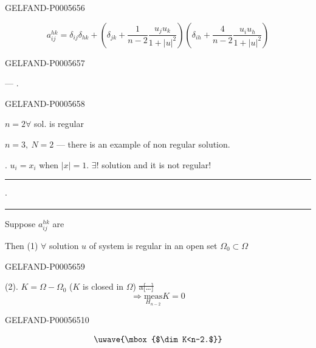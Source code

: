 \begin{GelfandAdjacentEvidence}{GELFAND-P000565}{6}

\[
a_{ij}^{hk}=\delta_{ij}\delta_{hk}+
\left(\delta_{jk}+\frac1{n-2}\frac{u_j u_k}{1+|u|^2}\right)
\left(\delta_{ih}+\frac4{n-2}\frac{u_i u_h}{1+|u|^2}\right)
\]
\end{GelfandAdjacentEvidence}
\begin{GelfandAdjacentEvidence}{GELFAND-P000565}{7}

 — .
\qquad{}
\end{GelfandAdjacentEvidence}
\begin{GelfandAdjacentEvidence}{GELFAND-P000565}{8}

\underline{\(n=2\)}\qquad \(\forall\) sol. is regular

\underline{\(n=3,\ N=2\)} — there is an example of non regular solution.

. \(u_i=x_i\) when \(|x|=1\).
\(\exists!\) solution and it is not regular!

\noindent\hfill\rule{1.1cm}{.32pt}\enspace\(\cdot\)\enspace\rule{.9cm}{.32pt}\par
Suppose \(a_{ij}^{hk}\) are 

Then (1) \(\forall\) solution \(u\) of system is regular in an open set \(\Omega_0\subset\Omega\)
\end{GelfandAdjacentEvidence}
\begin{GelfandAdjacentEvidence}{GELFAND-P000565}{9}

(2). \(K=\Omega-\Omega_0\) (\(K\) is closed in \(\Omega\)) \sout{a[…]}
\[
\Rightarrow\underset{H_{n-2}}{\mathrm{meas}} K=0
\]
\end{GelfandAdjacentEvidence}
\begin{GelfandAdjacentEvidence}{GELFAND-P000565}{10}

\[
\uwave{\mbox{$\dim K<n-2.$}}
\]
\end{GelfandAdjacentEvidence}

